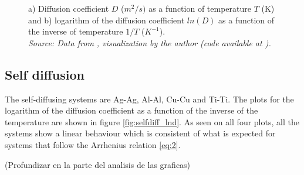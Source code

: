 \begin{figure}[H]
 \centering
 \captionsetup{justification=centering}
 \caption{a) Diffusion coefficient $D$ ($m^2/s)$ as a function of temperature $T$ (K) and b) logarithm of the diffusion coefficient $ln(D)$ as a function of the inverse of temperature $1/T$ ($K^{-1}$). \\
 \textit{Source: Data from \citep{kakusan}, visualization by the author (code available at \citep{mygit}).}}
 \label{fig:diffusion}
\end{figure}

\subsection{Self diffusion}

The self-diffusing systems are Ag-Ag, Al-Al, Cu-Cu and Ti-Ti. The plots for the logarithm of the diffusion coefficient as a function of the inverse of the temperature are shown in figure \ref{fig:selfdiff_lnd}. As seen on all four plots, all the systems show a linear behaviour which is consistent of what is expected for systems that follow the Arrhenius relation \eqref{eq:2}. 



(Profundizar en la parte del analisis de las graficas)

